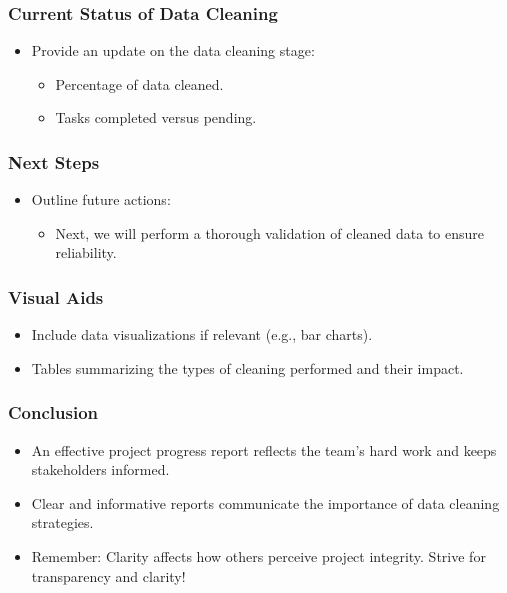 \documentclass[aspectratio=169]{beamer}
\begin{document}
\begin{frame}
    \frametitle{Current Status of Data Cleaning}
    \begin{itemize}
        \item Provide an update on the data cleaning stage:
        \begin{itemize}
            \item Percentage of data cleaned.
            \item Tasks completed versus pending.
        \end{itemize}
    \end{itemize}
\end{frame}

\begin{frame}
    \frametitle{Next Steps}
    \begin{itemize}
        \item Outline future actions:
        \begin{itemize}
            \item Next, we will perform a thorough validation of cleaned data to ensure reliability.
        \end{itemize}
    \end{itemize}
\end{frame}

\begin{frame}
    \frametitle{Visual Aids}
    \begin{itemize}
        \item Include data visualizations if relevant (e.g., bar charts).
        \item Tables summarizing the types of cleaning performed and their impact.
    \end{itemize}
\end{frame}

\begin{frame}
    \frametitle{Conclusion}
    \begin{itemize}
        \item An effective project progress report reflects the team's hard work and keeps stakeholders informed.
        \item Clear and informative reports communicate the importance of data cleaning strategies.
        \item Remember: Clarity affects how others perceive project integrity. Strive for transparency and clarity!
    \end{itemize}
\end{frame}
\end{document}
